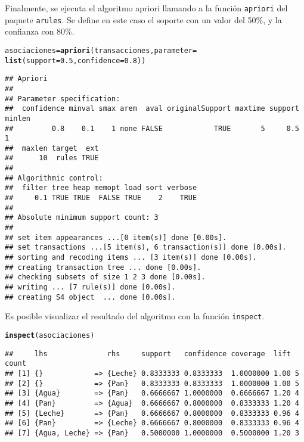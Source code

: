 \documentclass[12pt]{report}\usepackage[]{graphicx}\usepackage[dvipsnames]{xcolor}
\makeatletter
\newcommand{\hlnum}[1]{\textcolor[rgb]{0.686,0.059,0.569}{#1}}%
\newcommand{\hlstd}[1]{\textcolor[rgb]{0.345,0.345,0.345}{#1}}%
\newcommand{\hlkwb}[1]{\textcolor[rgb]{0.69,0.353,0.396}{#1}}%
\newcommand{\hlkwc}[1]{\textcolor[rgb]{0.333,0.667,0.333}{#1}}%
\newcommand{\hlkwd}[1]{\textcolor[rgb]{0.737,0.353,0.396}{\textbf{#1}}}%
\newenvironment{kframe}{%
 \def\at@end@of@kframe{}%
 \ifinner\ifhmode%
  \def\at@end@of@kframe{\end{minipage}}%
  \begin{minipage}{\columnwidth}%
 \fi\fi%
 \def\FrameCommand##1{\hskip\@totalleftmargin \hskip-\fboxsep
 \colorbox{shadecolor}{##1}\hskip-\fboxsep
     \hskip-\linewidth \hskip-\@totalleftmargin \hskip\columnwidth}%
 \MakeFramed {\advance\hsize-\width
   \@totalleftmargin\z@ \linewidth\hsize
   \@setminipage}}%
 {\par\unskip\endMakeFramed%
 \at@end@of@kframe}
\newenvironment{knitrout}{}{} %
\makeatother
\begin{document}
			Finalmente, se ejecuta el algoritmo apriori llamando a la función \texttt{apriori} del paquete \texttt{arules}. Se define en este caso el soporte con un valor del 50\%, y la confianza con 80\%. 
			
\begin{knitrout}
\color{fgcolor}\begin{kframe}
\begin{alltt}
\hlstd{asociaciones} \hlkwb{=} \hlkwd{apriori}\hlstd{(transacciones,} \hlkwc{parameter} \hlstd{=}
\hlkwd{list}\hlstd{(}\hlkwc{support} \hlstd{=} \hlnum{0.5}\hlstd{,} \hlkwc{confidence} \hlstd{=} \hlnum{0.8}\hlstd{))}
\end{alltt}
\begin{verbatim}
## Apriori
## 
## Parameter specification:
##  confidence minval smax arem  aval originalSupport maxtime support minlen
##         0.8    0.1    1 none FALSE            TRUE       5     0.5      1
##  maxlen target  ext
##      10  rules TRUE
## 
## Algorithmic control:
##  filter tree heap memopt load sort verbose
##     0.1 TRUE TRUE  FALSE TRUE    2    TRUE
## 
## Absolute minimum support count: 3 
## 
## set item appearances ...[0 item(s)] done [0.00s].
## set transactions ...[5 item(s), 6 transaction(s)] done [0.00s].
## sorting and recoding items ... [3 item(s)] done [0.00s].
## creating transaction tree ... done [0.00s].
## checking subsets of size 1 2 3 done [0.00s].
## writing ... [7 rule(s)] done [0.00s].
## creating S4 object  ... done [0.00s].
\end{verbatim}
\end{kframe}
\end{knitrout}
			
			Es posible visualizar el resultado del algoritmo con la función \texttt{inspect}. 
			
\begin{knitrout}
\color{fgcolor}\begin{kframe}
\begin{alltt}
\hlkwd{inspect}\hlstd{(asociaciones)}
\end{alltt}
\begin{verbatim}
##     lhs              rhs     support   confidence coverage  lift count
## [1] {}            => {Leche} 0.8333333 0.8333333  1.0000000 1.00 5    
## [2] {}            => {Pan}   0.8333333 0.8333333  1.0000000 1.00 5    
## [3] {Agua}        => {Pan}   0.6666667 1.0000000  0.6666667 1.20 4    
## [4] {Pan}         => {Agua}  0.6666667 0.8000000  0.8333333 1.20 4    
## [5] {Leche}       => {Pan}   0.6666667 0.8000000  0.8333333 0.96 4    
## [6] {Pan}         => {Leche} 0.6666667 0.8000000  0.8333333 0.96 4    
## [7] {Agua, Leche} => {Pan}   0.5000000 1.0000000  0.5000000 1.20 3
\end{verbatim}
\end{kframe}
\end{knitrout}
			
\end{document}
